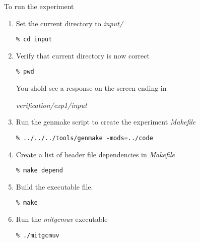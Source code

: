  To run the experiment

\begin{enumerate}
\item Set the current directory to {\it input/ }

\begin{verbatim}
% cd input
\end{verbatim}

\item Verify that current directory is now correct

\begin{verbatim}
% pwd
\end{verbatim}

 You shold see a response on the screen ending in

{\it verification/exp1/input }


\item Run the genmake script to create the experiment {\it Makefile}

\begin{verbatim}
% ../../../tools/genmake -mods=../code
\end{verbatim}

\item Create a list of header file dependencies in {\it Makefile}

\begin{verbatim}
% make depend
\end{verbatim}

\item Build the executable file.

\begin{verbatim}
% make
\end{verbatim}

\item Run the {\it mitgcmuv} executable

\begin{verbatim}
% ./mitgcmuv
\end{verbatim}

\end{enumerate}



